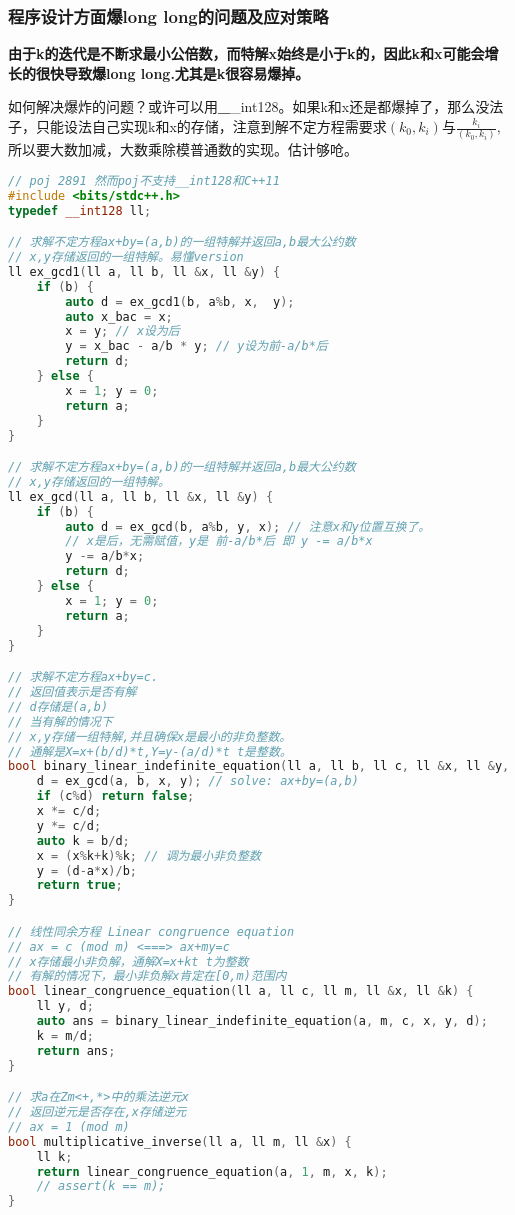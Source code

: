 		\subsubsection{程序设计方面爆long long的问题及应对策略}
		\par {\bfseries 由于k的迭代是不断求最小公倍数，而特解x始终是小于k的，因此k和x可能会增长的很快导致爆long long.尤其是k很容易爆掉。}
		\par 如何解决爆炸的问题？或许可以用{\textbf \_\_int128}。如果k和x还是都爆掉了，那么没法子，只能设法自己实现k和x的存储，注意到解不定方程需要求$(k_0,k_i)$与$\frac{k_i}{(k_0,k_i)}$,所以要大数加减，大数乘除模普通数的实现。估计够呛。
		\begin{lstlisting}[language={c++}]
// poj 2891 然而poj不支持__int128和C++11
#include <bits/stdc++.h>
typedef __int128 ll;

// 求解不定方程ax+by=(a,b)的一组特解并返回a,b最大公约数
// x,y存储返回的一组特解。易懂version
ll ex_gcd1(ll a, ll b, ll &x, ll &y) {
	if (b) {
		auto d = ex_gcd1(b, a%b, x,  y);
		auto x_bac = x;
		x = y; // x设为后
		y = x_bac - a/b * y; // y设为前-a/b*后
		return d;
	} else {
		x = 1; y = 0;
		return a;
	}
}

// 求解不定方程ax+by=(a,b)的一组特解并返回a,b最大公约数
// x,y存储返回的一组特解。
ll ex_gcd(ll a, ll b, ll &x, ll &y) {
	if (b) {
		auto d = ex_gcd(b, a%b, y, x); // 注意x和y位置互换了。
		// x是后，无需赋值，y是 前-a/b*后 即 y -= a/b*x
		y -= a/b*x;
		return d;
	} else {
		x = 1; y = 0;
		return a;
	}
}

// 求解不定方程ax+by=c.
// 返回值表示是否有解
// d存储是(a,b)
// 当有解的情况下
// x,y存储一组特解,并且确保x是最小的非负整数。
// 通解是X=x+(b/d)*t,Y=y-(a/d)*t t是整数。
bool binary_linear_indefinite_equation(ll a, ll b, ll c, ll &x, ll &y, ll &d) {
	d = ex_gcd(a, b, x, y); // solve: ax+by=(a,b)
	if (c%d) return false;
	x *= c/d;
	y *= c/d;
	auto k = b/d;
	x = (x%k+k)%k; // 调为最小非负整数
	y = (d-a*x)/b;
	return true;
}

// 线性同余方程 Linear congruence equation
// ax = c (mod m) <===> ax+my=c
// x存储最小非负解，通解X=x+kt t为整数
// 有解的情况下，最小非负解x肯定在[0,m)范围内
bool linear_congruence_equation(ll a, ll c, ll m, ll &x, ll &k) {
	ll y, d;
	auto ans = binary_linear_indefinite_equation(a, m, c, x, y, d);
	k = m/d;
	return ans;
}

// 求a在Zm<+,*>中的乘法逆元x
// 返回逆元是否存在,x存储逆元
// ax = 1 (mod m)
bool multiplicative_inverse(ll a, ll m, ll &x) {
	ll k;
	return linear_congruence_equation(a, 1, m, x, k);
	// assert(k == m);
}


\end{lstlisting}
